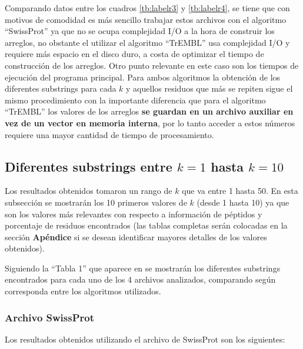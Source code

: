 Comparando datos entre los cuadros \ref{tb:labelr3} y \ref{tb:labelr4}, se tiene que con motivos de comodidad es más sencillo trabajar estos archivos con el algoritmo ``SwissProt'' ya que no se ocupa complejidad I/O a la hora de construir los arreglos, no obstante el utilizar el algoritmo ``TrEMBL'' usa complejidad I/O y requiere más espacio en el disco duro, a costa de optimizar el tiempo de construcción de los arreglos. Otro punto relevante en este caso son los tiempos de ejecución del programa principal. Para ambos algoritmos la obtención de los diferentes substrings para cada $k$ y aquellos residuos que más se repiten sigue el mismo procedimiento con la importante diferencia que para el algoritmo ``TrEMBL'' los valores de los arreglos \textbf{se guardan en un archivo auxiliar en vez de un vector en memoria interna}, por lo tanto acceder a estos números requiere una mayor cantidad de tiempo de procesamiento.  

\subsection{Diferentes substrings entre $k = 1$ hasta $k = 10$}

Los resultados obtenidos tomaron un rango de $k$ que va entre 1 hasta 50. En esta subsección se mostrarán los 10 primeros valores de $k$ (desde 1 hasta 10) ya que son los valores más relevantes con respecto a información de péptidos y porcentaje de residuos encontrados (las tablas completas serán colocadas en la sección \textbf{Apéndice} si se desean identificar mayores detalles de los valores obtenidos).

Siguiendo la ``Tabla 1'' que aparece en \cite{searching} se mostrarán los diferentes substrings encontrados para cada uno de los 4 archivos analizados, comparando según corresponda entre los algoritmos utilizados.

\subsubsection{Archivo SwissProt}

Los resultados obtenidos utilizando el archivo de SwissProt son los siguientes:

